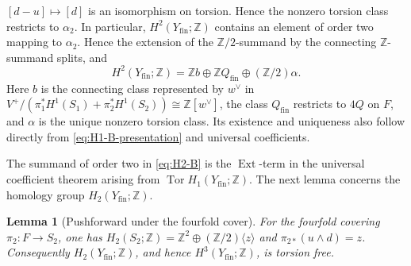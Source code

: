 \documentclass[11pt]{article}
\newtheorem{lemma}[theorem]{Lemma}
\theoremstyle{definition}
\theoremstyle{remark}
\numberwithin{equation}{section}
\begin{document}
$[d-u]\mapsto[d]$ is an isomorphism on torsion.  Hence the nonzero torsion
class restricts to $\alpha_2$.  In particular,
$H^2(Y_{\mathrm{fin}};\mathbb Z)$ contains an element of order two mapping to
$\alpha_2$.  Hence the extension of the $\mathbb Z/2$-summand by the
connecting $\mathbb Z$-summand splits, and
\begin{equation}\label{eq:H2-B}
 H^2(Y_{\mathrm{fin}};\mathbb Z)=
 \mathbb Z b\oplus\mathbb Z Q_{\mathrm{fin}}
 \oplus(\mathbb Z/2)\alpha.
\end{equation}
Here $b$ is the connecting class represented by $w^\vee$ in
$V^+/(\pi_1^*H^1(S_1)+\pi_2^*H^1(S_2))\cong\mathbb Z[w^\vee]$, the class
$Q_{\mathrm{fin}}$ restricts to $4Q$ on $F$, and $\alpha$ is the
unique nonzero torsion class.  Its existence and uniqueness also follow directly
from \eqref{eq:H1-B-presentation} and universal coefficients.

The summand of order two in \eqref{eq:H2-B} is the
$\operatorname{Ext}$-term in the universal coefficient theorem arising
from $\operatorname{Tor}H_1(Y_{\mathrm{fin}};\mathbb Z)$.
The next lemma concerns the homology group $H_2(Y_{\mathrm{fin}};\mathbb Z)$.

\begin{lemma}[Pushforward under the fourfold cover]
\label{lem:fourfold-pushforward}
For the fourfold covering $\pi_2:F\to S_2$, one has
$H_2(S_2;\mathbb Z)=\mathbb Z^2\oplus
(\mathbb Z/2)\langle z\rangle$ and $\pi_{2*}(u\wedge d)=z$.
Consequently $H_2(Y_{\mathrm{fin}};\mathbb Z)$, and hence
$H^3(Y_{\mathrm{fin}};\mathbb Z)$, is torsion free.
\end{lemma}
\end{document}
